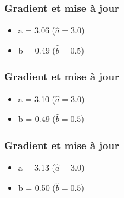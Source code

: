 \begin{frame}
  \frametitle{Gradient et mise à jour}
  \begin{itemize}
  \item a = 3.06 ($\hat{a} = 3.0$)
  \item b = 0.49 ($\hat{b} = 0.5$)
  \end{itemize}
\end{frame}

\begin{frame}
  \frametitle{Gradient et mise à jour}
  \begin{itemize}
  \item a = 3.10 ($\hat{a} = 3.0$)
  \item b = 0.49 ($\hat{b} = 0.5$)
  \end{itemize}
\end{frame}

\begin{frame}
  \frametitle{Gradient et mise à jour}
  \begin{itemize}
  \item a = 3.13 ($\hat{a} = 3.0$)
  \item b = 0.50 ($\hat{b} = 0.5$)
  \end{itemize}
\end{frame}
